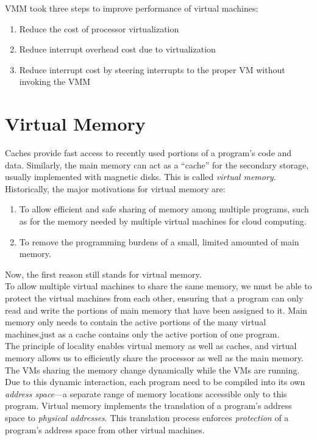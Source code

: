 \documentclass[12pt]{article}
\theoremstyle{definition}
\begin{document}
  VMM took three steps to improve performance of virtual machines:
  \begin{enumerate}
    \item Reduce the cost of processor virtualization
    \item Reduce interrupt overhead cost due to virtualization
    \item Reduce interrupt cost by steering interrupts to the proper VM without invoking the VMM
  \end{enumerate}

  \section{Virtual Memory}
  Caches provide fast access to recently used portions of a program's code and data.
  Similarly, the main memory can act as a ``cache'' for the secondary storage, usually implemented with magnetic disks.
  This is called \emph{virtual memory}. \\

  Historically, the major motivations for virtual memory are:
  \begin{enumerate}
    \item To allow efficient and safe sharing of memory among multiple programs, such as for the memory needed by multiple virtual machines for cloud computing.
    \item To remove the programming burdens of a small, limited amounted of main memory.
  \end{enumerate}
  Now, the first reason still stands for virtual memory. \\

  To allow multiple virtual machines to share the same memory, we must be able to protect the virtual machines from each other, ensuring that a program can only read and write the portions of main memory that have been assigned to it.
  Main memory only needs to contain the active portions of the many virtual machines,just as a cache contains only the active portion of one program. \\
  The principle of locality enables virtual memory as well as caches, and virtual memory allows us to efficiently share the processor as well as the main memory. \\

  The VMs sharing the memory change dynamically while the VMs are running.
  Due to this dynamic interaction, each program need to be compiled into its own \emph{address space}---a separate range of memory locations accessible only to this program.
  Virtual memory implements the translation of a program's address space to \emph{physical addresses}.
  This translation process enforces \emph{protection} of a program's address space from other virtual machines. \\
\end{document}
